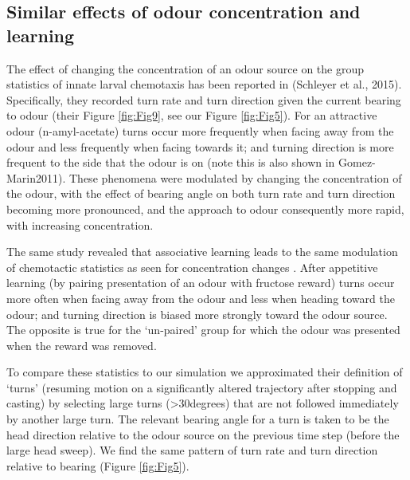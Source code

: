 \documentclass[10pt,a4paper]{article}
\begin{document}




\subsection{Similar effects of odour concentration and learning}
The effect of changing the concentration of an odour source on the group statistics of innate larval chemotaxis has been reported in (Schleyer et al., 2015). Specifically, they recorded turn rate and turn direction given the current bearing to odour (their Figure \ref{fig:Fig9}, see our Figure \ref{fig:Fig5}). For an attractive odour (n-amyl-acetate) turns occur more frequently when facing away from the odour and less frequently when facing towards it; and turning direction is more frequent to the side that the odour is on (note this is also shown in Gomez-Marin2011). These phenomena were modulated by changing the concentration of the odour, with the effect of bearing angle on both turn rate and turn direction becoming more pronounced, and the approach to odour consequently more rapid, with increasing concentration.

The same \cite{schleyer2015learning} study revealed that associative learning leads to the same modulation of chemotactic statistics as seen for concentration changes \citep[][Figure 5]{schleyer2015learning}. After appetitive learning (by pairing presentation of an odour with fructose reward) turns occur more often when facing away from the odour and less when heading toward the odour; and turning direction is biased more strongly toward the odour source. The opposite is true for the ‘un-paired’ group for which the odour was presented when the reward was removed. 


 To compare these statistics to our simulation we approximated their definition of ‘turns’ (resuming motion on a significantly altered trajectory after stopping and casting) by selecting large turns (>30degrees) that are not followed immediately by another large turn. The relevant bearing angle for a turn is taken to be the head direction relative to the odour source on the previous time step (before the large head sweep). We find the same pattern of turn rate and turn direction relative to bearing (Figure \ref{fig:Fig5}).
\end{document}
